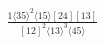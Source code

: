 \documentclass[varwidth, border=5pt]{standalone}
\begin{document}
\begin{my}
$\begin{gathered}
\scriptscriptstyle\frac{1⟨35⟩^2⟨15⟩[24][13]}{[12]^2⟨13⟩^3⟨45⟩}
\end{gathered}$
\end{my}
\end{document}
